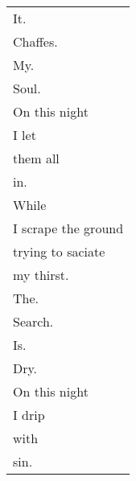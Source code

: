 \documentclass{article}
\begin{document}
\begin{center}
\begin{tabular}{l}
It. \\
\hh{}Chaffes. \\
\hh{}\hh{}My. \\
\hh{}\hh{}\hh{}Soul. \\
On this night \\
\hh{}I let \\
\hh{}them all \\
\hh{}in. \\
While \\
I scrape the ground \\
trying to saciate \\
my thirst. \\
The. \\
\hh{}Search. \\
\hh{}\hh{}Is. \\
\hh{}\hh{}\hh{}Dry. \\
On this night \\
\hh{}I drip \\
\hh{}with \\
\hh{}sin. \\
\end{tabular}
\end{center}
\end{document}
